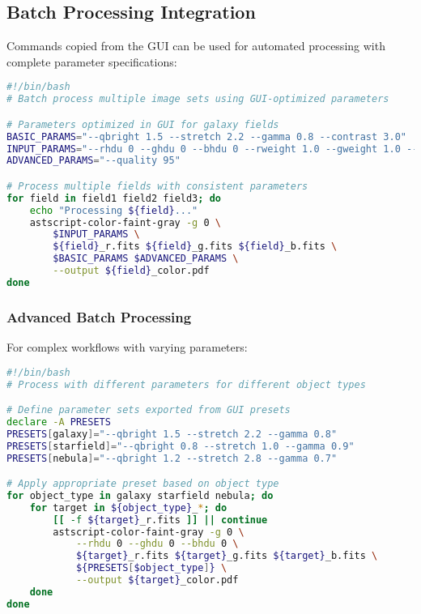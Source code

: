 \documentclass[11pt,a4paper]{article}
\begin{document}
\subsection{Batch Processing Integration}

Commands copied from the GUI can be used for automated processing with
complete parameter specifications:

\begin{lstlisting}[language=bash]
#!/bin/bash
# Batch process multiple image sets using GUI-optimized parameters

# Parameters optimized in GUI for galaxy fields  
BASIC_PARAMS="--qbright 1.5 --stretch 2.2 --gamma 0.8 --contrast 3.0"
INPUT_PARAMS="--rhdu 0 --ghdu 0 --bhdu 0 --rweight 1.0 --gweight 1.0 --bweight 1.0"
ADVANCED_PARAMS="--quality 95"

# Process multiple fields with consistent parameters
for field in field1 field2 field3; do
    echo "Processing ${field}..."
    astscript-color-faint-gray -g 0 \
        $INPUT_PARAMS \
        ${field}_r.fits ${field}_g.fits ${field}_b.fits \
        $BASIC_PARAMS $ADVANCED_PARAMS \
        --output ${field}_color.pdf
done
\end{lstlisting}

\subsubsection{Advanced Batch Processing}

For complex workflows with varying parameters:

\begin{lstlisting}[language=bash]
#!/bin/bash
# Process with different parameters for different object types

# Define parameter sets exported from GUI presets
declare -A PRESETS
PRESETS[galaxy]="--qbright 1.5 --stretch 2.2 --gamma 0.8"
PRESETS[starfield]="--qbright 0.8 --stretch 1.0 --gamma 0.9" 
PRESETS[nebula]="--qbright 1.2 --stretch 2.8 --gamma 0.7"

# Apply appropriate preset based on object type
for object_type in galaxy starfield nebula; do
    for target in ${object_type}_*; do
        [[ -f ${target}_r.fits ]] || continue
        astscript-color-faint-gray -g 0 \
            --rhdu 0 --ghdu 0 --bhdu 0 \
            ${target}_r.fits ${target}_g.fits ${target}_b.fits \
            ${PRESETS[$object_type]} \
            --output ${target}_color.pdf
    done
done
\end{lstlisting}
\end{document}
